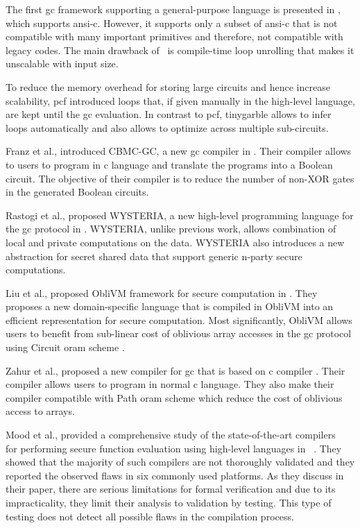 The first \acrshort{gc} framework supporting a general-purpose language is presented in \cite{holzer2012secure}, which supports \acrshort{ansi}-\gls{c}.
However, it supports only a subset of \acrshort{ansi}-\gls{c} that is not compatible with many important primitives and therefore, not compatible with legacy codes.
The main drawback of~\cite{holzer2012secure} is compile-time loop unrolling that makes it unscalable with input size.

To reduce the memory overhead for storing large circuits and hence increase scalability, \gls{pcf} \cite{kreuter2013pcf} introduced loops that, if given manually in the high-level language, are kept until the \acrshort{gc} evaluation.
In contrast to \gls{pcf}, \gls{tinygarble} allows to infer loops automatically and also allows to optimize across multiple sub-circuits.

Franz et al., introduced CBMC-GC, a new \acrshort{gc} compiler in \cite{franz2014cbmc}.
Their compiler allows to users to program in \gls{c} language and translate the programs into a Boolean circuit.
The objective of their compiler is to reduce the number of non-XOR gates in the generated Boolean circuits.

Rastogi et al., proposed WYSTERIA, a new high-level programming language for the \acrshort{gc} protocol in \cite{rastogi2014wysteria}.
WYSTERIA, unlike previous work, allows combination of local and private computations on the data.
WYSTERIA also introduces a new abstraction for secret shared data that support generic n-party secure computations.

Liu et al., proposed ObliVM framework for secure computation in \cite{liu2015oblivm}.
They proposes a new domain-specific language that is compiled in ObliVM into an efficient representation for secure computation.
Most significantly, ObliVM allows users to benefit from sub-linear cost of oblivious array accesses in the \acrshort{gc} protocol using Circuit \acrfull{oram} scheme \cite{wang2015circuit}.

Zahur et al., proposed a new compiler for \acrshort{gc} that is based on \gls{c} compiler \cite{zahur2015obliv}.
Their compiler allows users to program in normal \gls{c} language.
They also make their compiler compatible with Path \acrshort{oram} scheme \cite{stefanov2013path} which reduce the cost of oblivious access to arrays.

Mood et al., provided a comprehensive study of the state-of-the-art compilers~\cite{mood2012memory,kreuter2012billion,kreuter2013pcf, franz2014cbmc,zahur2015obliv,liu2015oblivm} for performing secure function evaluation using high-level languages in~\cite{mood2016frigate} .
They showed that the majority of such compilers are not thoroughly validated and they reported the observed flaws in six commonly used platforms.
As they discuss in their paper, there are serious limitations for formal verification and due to its impracticality, they limit their analysis to validation by testing.
This type of testing does not detect all possible flaws in the compilation process.

